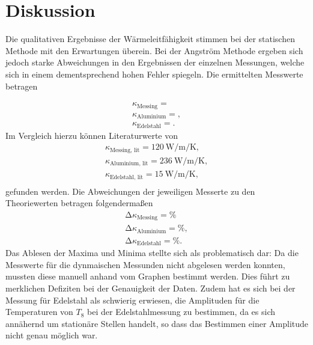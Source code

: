 \section{Diskussion}
\label{sec:Diskussion}
Die qualitativen Ergebnisse der Wärmeleitfähigkeit stimmen bei der statischen Methode mit den Erwartungen überein.
Bei der Angström Methode ergeben sich jedoch starke Abweichungen in den Ergebnissen der einzelnen Messungen, welche sich in einem dementsprechend hohen Fehler spiegeln.
Die ermittelten Messwerte betragen

\begin{align*}
  \kappa_\text{Messing} =  \\
  \kappa_\text{Aluminium} = ,\\
  \kappa_\text{Edelstahl} = .
\end{align*}
Im Vergleich hierzu können Literaturwerte von
\begin{align*}
  \kappa_\text{Messing, lit} = \SI{120}{\watt\per\metre\per\kelvin}, \\
  \kappa_\text{Aluminium, lit} = \SI{236}{\watt\per\metre\per\kelvin}, \\
  \kappa_\text{Edelstahl, lit} = \SI{15}{\watt\per\metre\per\kelvin}, \\
\end{align*}
gefunden werden.
Die Abweichungen der jeweiligen Messerte zu den Theoriewerten betragen folgendermaßen
\begin{align*}
  \increment \kappa_\text{Messing} =  \si{\percent}\\
  \increment \kappa_\text{Aluminium} =  \si{\percent},\\
  \increment \kappa_\text{Edelstahl} =  \si{\percent}.
\end{align*}
Das Ablesen der Maxima und Minima stellte sich als problematisch dar:
Da die Messwerte für die dynmaischen Messunden nicht abgelesen werden konnten, mussten diese manuell anhand vom Graphen bestimmt werden.
Dies führt zu merklichen Defiziten bei der Genauigkeit der Daten.
Zudem hat es sich bei der Messung für Edelstahl als schwierig erwiesen, die Amplituden für die Temperaturen von $T_8$ bei der Edelstahlmessung zu bestimmen, da es sich annähernd um stationäre Stellen handelt, so dass das Bestimmen einer Amplitude nicht genau möglich war.
